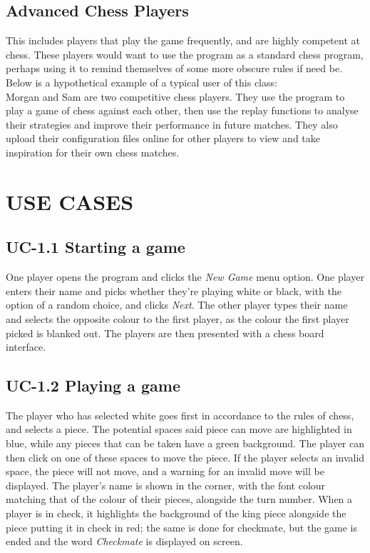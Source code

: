 \documentclass{project}
\begin{document}
\subsection{Advanced Chess Players}
This includes players that play the game frequently, and are highly competent at chess. These players would want to use the program as a standard chess program, perhaps using it to remind themselves of some more obscure rules if need be. Below is a hypothetical example of a typical user of this class:\\
Morgan and Sam are two competitive chess players. They use the program to play a game of chess against each other, then use the replay functions to analyse their strategies and improve their performance in future matches. They also upload their configuration files online for other players to view and take inspiration for their own chess matches.
\section{USE CASES}
\subsection{UC-1.1 Starting a game}
One player opens the program and clicks the \emph{New Game} menu option. One player enters their name and picks whether they're playing white or black, with the option of a random choice, and clicks \emph{Next}. The other player types their name and selects the opposite colour to the first player, as the colour the first player picked is blanked out. The players are then presented with a chess board interface.
\subsection{UC-1.2 Playing a game}
The player who has selected white goes first in accordance to the rules of chess, and selects a piece. The potential spaces said piece can move are highlighted in blue, while any pieces that can be taken have a green background. The player can then click on one of these spaces to move the piece. If the player selects an invalid space, the piece will not move, and a warning for an invalid move will be displayed. The player's name is shown in the corner, with the font colour matching that of the colour of their pieces, alongside the turn number. When a player is in check, it highlights the background of the king piece alongside the piece putting it in check in red; the same is done for checkmate, but the game is ended and the word \emph{Checkmate} is displayed on screen.
\end{document}
